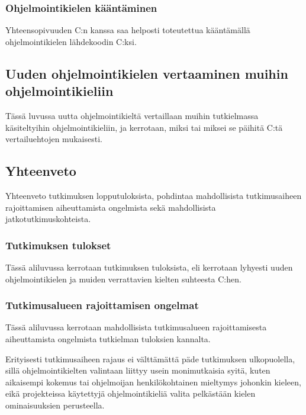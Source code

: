 \subsubsection{Ohjelmointikielen kääntäminen}

Yhteensopivuuden C:n kanssa saa helposti toteutettua kääntämällä
ohjelmointikielen lähdekoodin C:ksi.

\subsection[Uuden ohjelmointikielen vertaaminen muihin ohjelmointikieliin]
{Uuden ohjelmointikielen vertaaminen muihin \\ ohjelmointikieliin}

Tässä luvussa uutta ohjelmointikieltä vertaillaan muihin tutkielmassa
käsiteltyihin ohjelmointikieliin, ja kerrotaan, miksi tai miksei se päihitä
C:tä vertailuehtojen mukaisesti.

\subsection{Yhteenveto}

Yhteenveto tutkimuksen lopputuloksista, pohdintaa mahdollisista tutkimusaiheen
rajoittamisen aiheuttamista ongelmista sekä mahdollisista
jatkotutkimuskohteista.

\subsubsection{Tutkimuksen tulokset}

Tässä aliluvussa kerrotaan tutkimuksen tuloksista, eli kerrotaan lyhyesti uuden
ohjelmointikielen ja muiden verrattavien kielten suhteesta C:hen.

\subsubsection{Tutkimusalueen rajoittamisen ongelmat}

Tässä aliluvussa kerrotaan mahdollisista tutkimusalueen rajoittamisesta
aiheuttamista ongelmista tutkielman tuloksien kannalta.

Erityisesti tutkimusaiheen rajaus ei välttämättä päde tutkimuksen ulkopuolella,
sillä ohjelmointikielten valintaan liittyy usein monimutkaisia syitä, kuten
aikaisempi kokemus tai ohjelmoijan henkilökohtainen mieltymys johonkin kieleen,
eikä projekteissa käytettyjä ohjelmointikieliä valita pelkästään kielen
ominaisuuksien perusteella.

